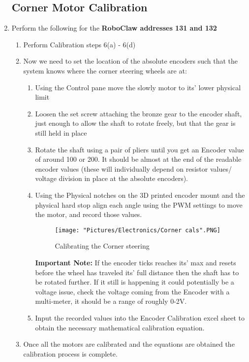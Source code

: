 \documentclass[12pt]{article}
\begin{document}
\begin{enumerate}
\subsection{Corner Motor Calibration}
	\item Perform the following for the \textbf{RoboClaw addresses 131 and 132}
	\begin{enumerate}
		\item Perform Calibration steps 6(a) - 6(d)
		\item Now we need to set the location of the absolute encoders such that the system knows where the corner steering wheels are at:
		\begin{enumerate}
			\item Using the Control pane move the slowly motor to its' lower physical limit
			\item Loosen the set screw attaching the bronze gear to the encoder shaft, just enough to allow the shaft to rotate freely, but that the gear is still held in place
			\item Rotate the shaft using a pair of pliers until you get an Encoder value of around 100 or 200. It should be almost at the end of the readable encoder values (these will individually depend on resistor values/ voltage division in place at the absolute encoders).
			\item Using the Physical notches on the 3D printed encoder mount and the physical hard stop align each angle using the PWM settings to move the motor, and record those values. 
			\begin{figure}[H]
 				\centering
				\texttt{[image: "Pictures/Electronics/Corner cals".PNG]}
 				\caption{Calibrating the Corner steering}
				\label{Corner cals}
			\end{figure}			


			\textbf{Important Note:} If the encoder ticks reaches its' max and resets before the wheel has traveled its' full distance then the shaft has to be rotated further. If it still is happening it could potentially be a voltage issue, check the voltage coming from the Encoder with a multi-meter, it should be a range of roughly 0-2V.
			\item Input the recorded values into the Encoder Calibration excel sheet to obtain the necessary mathematical calibration equation.
		\end{enumerate}
	\item Once all the motors are calibrated and the equations are obtained the calibration process is complete.
	\end{enumerate}
\end{enumerate} 
\end{document}
